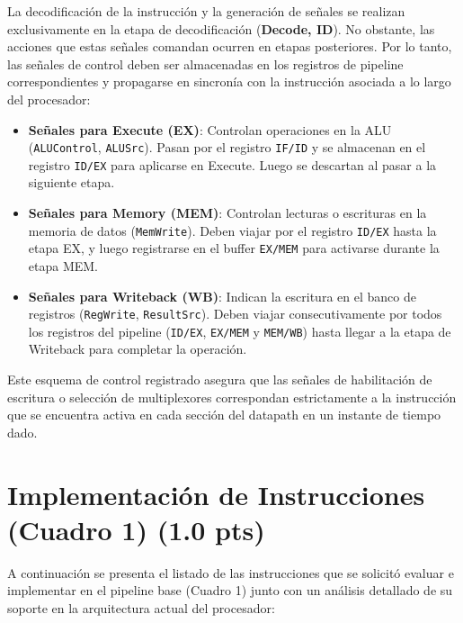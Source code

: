 \documentclass[12pt, a4paper]{article}
\begin{document}
La decodificación de la instrucción y la generación de señales se realizan exclusivamente en la etapa de decodificación (\textbf{Decode, ID}). No obstante, las acciones que estas señales comandan ocurren en etapas posteriores. Por lo tanto, las señales de control deben ser almacenadas en los registros de pipeline correspondientes y propagarse en sincronía con la instrucción asociada a lo largo del procesador:
\begin{itemize}
  \item \textbf{Señales para Execute (EX)}: Controlan operaciones en la ALU (\texttt{ALUControl}, \texttt{ALUSrc}). Pasan por el registro \texttt{IF/ID} y se almacenan en el registro \texttt{ID/EX} para aplicarse en Execute. Luego se descartan al pasar a la siguiente etapa.
  \item \textbf{Señales para Memory (MEM)}: Controlan lecturas o escrituras en la memoria de datos (\texttt{MemWrite}). Deben viajar por el registro \texttt{ID/EX} hasta la etapa EX, y luego registrarse en el buffer \texttt{EX/MEM} para activarse durante la etapa MEM.
  \item \textbf{Señales para Writeback (WB)}: Indican la escritura en el banco de registros (\texttt{RegWrite}, \texttt{ResultSrc}). Deben viajar consecutivamente por todos los registros del pipeline (\texttt{ID/EX}, \texttt{EX/MEM} y \texttt{MEM/WB}) hasta llegar a la etapa de Writeback para completar la operación.
\end{itemize}
Este esquema de control registrado asegura que las señales de habilitación de escritura o selección de multiplexores correspondan estrictamente a la instrucción que se encuentra activa en cada sección del datapath en un instante de tiempo dado.

\section{Implementación de Instrucciones (Cuadro 1) (1.0 pts)}

A continuación se presenta el listado de las instrucciones que se solicitó evaluar e implementar en el pipeline base (Cuadro 1) junto con un análisis detallado de su soporte en la arquitectura actual del procesador:
\end{document}
